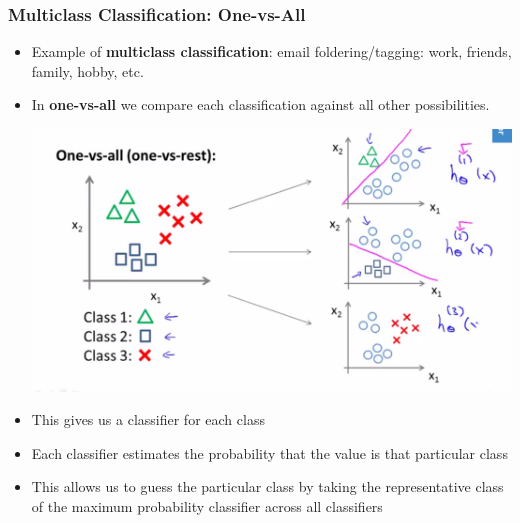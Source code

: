 \subsubsection{Multiclass Classification: One-vs-All}
\begin{itemize}[--]
	\item Example of \textbf{multiclass classification}: email foldering/tagging: work, friends, family, hobby, etc.
	\item In \textbf{one-vs-all} we compare each classification against all other possibilities. 
	\begin{center}
		\includegraphics[scale=0.5]{sections/cs229/w3/multiclass.png}
	\end{center}

	\item This gives us a classifier for each class
	\item Each classifier estimates the probability that the value is that particular class
	\item This allows us to guess the particular class by taking the representative class of the maximum probability classifier across all classifiers
\end{itemize}